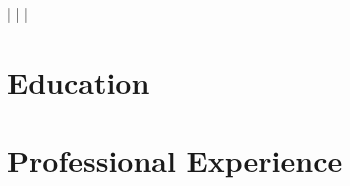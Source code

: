 \documentclass[a4paper,11pt]{article}
\begin{document}
    \begin{center}
        \myName
        \myAddress
        \myWebsite | \myMailAddress | \myGithub | \myPhoneNumber 
    \end{center}

    \section{Education}
        \begin{itemize}
            \postdoc
                \cvItemizeBegin
                    \postdocOne
                    \postdocTwo
                \cvItemizeEnd
            \summerSchool
                \cvItemizeBegin
                    \summerSchoolOne
                    \summerSchoolTwo
                \cvItemizeEnd
            \phd
                \cvItemizeBegin
                    \phdOne
                    \phdTwo
                \cvItemizeEnd
            \msc
                \cvItemizeBegin
                    \mscOne
                    \mscTwo
                    \mscThree
                \cvItemizeEnd
            \erasmus
                \cvItemizeBegin
                    \erasmusOne
                \cvItemizeEnd
            \bsc
                \cvItemizeBegin
                    \bscOne
                \cvItemizeEnd
        \end{itemize}

    \section{Professional Experience}
        \begin{itemize}
            \expFlowers
                \cvItemizeBegin
                    \expFlowersOne
                    \expFlowersTwo
                \cvItemizeEnd
            \expTum
                \cvItemizeBegin
                    \expTumOne
                    \expTumTwo
                \cvItemizeEnd
            \expInfineon
                \cvItemizeBegin
                    \expInfineonOne
                    \expInfineonTwo
                \cvItemizeEnd
            \expBmw
                \cvItemizeBegin
                    \expBmwOne
                    \expBmwTwo
                \cvItemizeEnd
            \expEgnition
                \expEgnitionDriverless
                \expEgnitionBusinessPlan    
                \expEgnitionTeamLeader
                \expEgnitionAerodynamics
            \expSlive
                \cvItemizeBegin
                    \expSliveOne
                    \expSliveTwo
                \cvItemizeEnd
            \expTuhh
                \cvItemizeBegin
                    \expTuhhOne
                    \expSliveTwo
                \cvItemizeEnd
        \end{itemize}
\end{document}
